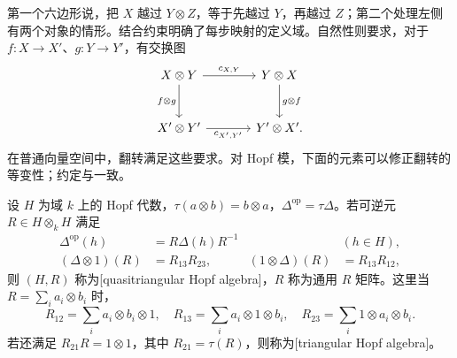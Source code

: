 第一个六边形说，把 \(X\) 越过 \(Y\otimes Z\)，等于先越过 \(Y\)，再越过 \(Z\)；第二个处理左侧有两个对象的情形。结合约束明确了每步映射的定义域。自然性则要求，对于 \(f:X\to X'\)、\(g:Y\to Y'\)，有交换图
\[
	\begin{tikzcd}[column sep=large,row sep=large]
		X\otimes Y\arrow[r,"c_{X,Y}"]\arrow[d,"f\otimes g"']
		&Y\otimes X\arrow[d,"g\otimes f"]\\
		X'\otimes Y'\arrow[r,"c_{X',Y'}"']&Y'\otimes X'.
	\end{tikzcd}
\]
在普通向量空间中，翻转满足这些要求。对 Hopf 模，下面的元素可以修正翻转的等变性；约定与\cite[Definition 8.3.1, pp. 198--199]{EtingofEtAl2015TensorCategories}一致。

\begin{definition}\label{b5:def:B-quasitriangular}
	设 \(H\) 为域 \(k\) 上的 Hopf 代数，\(\tau(a\otimes b)=b\otimes a\)，\(\Delta^{\mathrm{op}}=\tau\Delta\)。若可逆元 \(R\in H\otimes_kH\) 满足
	\begin{equation}\label{b5:eq:B-universal-r}
		\begin{aligned}
			\Delta^{\mathrm{op}}(h)&=R\Delta(h)R^{-1} &&(h\in H),\\
			(\Delta\otimes1)(R)&=R_{13}R_{23},&
			(1\otimes\Delta)(R)&=R_{13}R_{12},
		\end{aligned}
	\end{equation}
	则 \((H,R)\) 称为[quasitriangular Hopf algebra]，\(R\) 称为通用 \(R\) 矩阵。这里当 \(R=\sum_i a_i\otimes b_i\) 时，
	\[
		R_{12}=\sum_i a_i\otimes b_i\otimes1,\quad
		R_{13}=\sum_i a_i\otimes1\otimes b_i,\quad
		R_{23}=\sum_i1\otimes a_i\otimes b_i.
	\]
	若还满足 \(R_{21}R=1\otimes1\)，其中 \(R_{21}=\tau(R)\)，则称为[triangular Hopf algebra]。
\end{definition}

